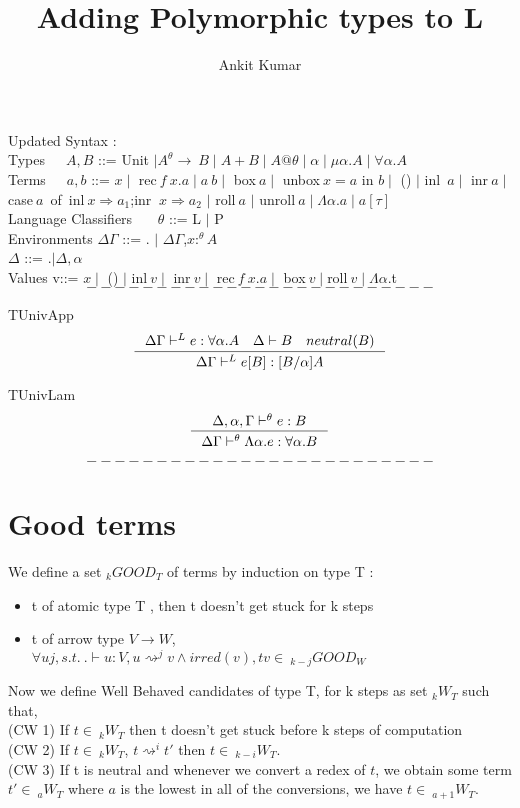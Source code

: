 \documentclass[12pt]{article}
\title{%
  Adding Polymorphic types to L\theta}
\author{Ankit Kumar}
\begin{document}
Updated Syntax :\\

Types\ \ \ $A,B$ ::= Unit $\mid A^{\theta} \rightarrow\ B \mid A+B
\mid A@\theta \mid \alpha \mid \mu \alpha.A \mid \forall \alpha.A$ \\

Terms\ \ \ $a,b$ ::= $x \mid$  rec$\ f\ x.a \mid a\ b \mid$ box$\ a \mid$
unbox$\ x=a$ in $b \mid$ () $\mid$ inl\ $a \mid$ inr$\ a \mid$ case$\ a$\ of\
{inl$\ x \Rightarrow a_1$;inr $\ x \Rightarrow a_2$} $\mid$ roll$\ a$
$\mid$ unroll$\ a \mid \Lambda \alpha.a \mid a[\tau]$  \\

Language Classifiers \ \ \  $\theta$ ::= L $\mid$ P \\

Environments $\Delta\Gamma$ ::= . $\mid $ $\Delta \Gamma$,$x:^{\theta}
A$\\

 \hspace{25 mm}           $ \Delta$   ::=  .$\mid \Delta,\alpha$\\

Values v::= $x \mid $ () $\mid $ inl$\ v \mid $ inr$\ v \mid $ rec$\
f\ x.a \mid $ box$\ v \mid $roll$\ v \mid \Lambda \alpha$.t\\
$$
-------------------------
$$

TUnivApp
$$
\inference{\Delta\Gamma \vdash^{L} e:\forall \alpha.A \quad \Delta \vdash
B \quad neutral(B)}{\Delta\Gamma \vdash^{L} e[B]:[B/\alpha]A}  
$$

TUnivLam
$$
\inference{\Delta,\alpha,\Gamma \vdash^{\theta} e:B}{\Delta\Gamma
  \vdash^{\theta} \Lambda \alpha.e:\forall \alpha.B}
$$


$$
-------------------------
$$

\section{Good terms}
We define a set $_kGOOD_T$ of terms by induction on type T :
\begin{itemize}
\item t of atomic type T , then t doesn't get stuck for k steps
\item t of arrow type $V \rightarrow W$, $\forall u j,  s.t.\  .\vdash u : V, u
  \rightsquigarrow^j v \wedge irred(v), tv \in\ _{k-j}GOOD_W$
\end{itemize}

Now we define Well Behaved candidates of type T, for k steps as set $_kW_T$
such that,\\
(CW 1) If $t \in\  _kW_T$ then t doesn't get stuck before k steps of
computation\\
(CW 2)  If $t \in\  _kW_T$, $t \rightsquigarrow^i t'$ then $t \in\
_{k-i}W_T$.\\
(CW 3) If t is neutral and whenever we convert a redex of $t$, we obtain
some term $t' \in\  _aW_T$ where $a$ is the lowest in all of the
conversions, we have  $t \in\  _{a+1}W_T$.\\
\end{document}

